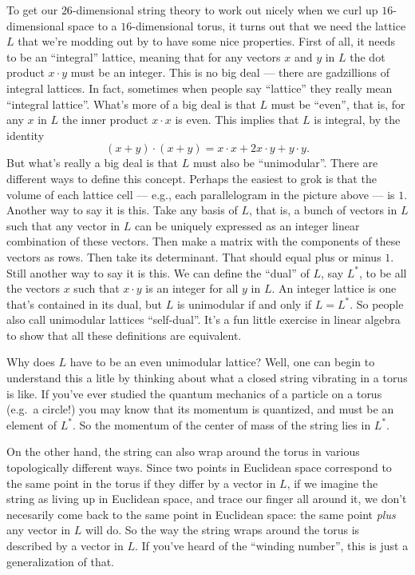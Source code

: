 \documentclass{article}
\begin{document}
To get our \(26\)-dimensional string theory to work out nicely when we
curl up \(16\)-dimensional space to a \(16\)-dimensional torus, it turns
out that we need the lattice \(L\) that we're modding out by to have
some nice properties. First of all, it needs to be an ``integral''
lattice, meaning that for any vectors \(x\) and \(y\) in \(L\) the dot
product \(x\cdot y\) must be an integer. This is no big deal --- there
are gadzillions of integral lattices. In fact, sometimes when people say
``lattice'' they really mean ``integral lattice''. What's more of a big
deal is that \(L\) must be ``even'', that is, for any \(x\) in \(L\) the
inner product \(x\cdot x\) is even. This implies that \(L\) is integral,
by the identity
\[(x + y)\cdot (x + y) = x\cdot x + 2x\cdot y + y\cdot y.\] But what's
really a big deal is that \(L\) must also be ``unimodular''. There are
different ways to define this concept. Perhaps the easiest to grok is
that the volume of each lattice cell --- e.g., each parallelogram in the
picture above --- is \(1\). Another way to say it is this. Take any
basis of \(L\), that is, a bunch of vectors in \(L\) such that any
vector in \(L\) can be uniquely expressed as an integer linear
combination of these vectors. Then make a matrix with the components of
these vectors as rows. Then take its determinant. That should equal plus
or minus \(1\). Still another way to say it is this. We can define the
``dual'' of \(L\), say \(L^*\), to be all the vectors \(x\) such that
\(x\cdot y\) is an integer for all \(y\) in \(L\). An integer lattice is
one that's contained in its dual, but \(L\) is unimodular if and only if
\(L = L^*\). So people also call unimodular lattices ``self-dual''. It's
a fun little exercise in linear algebra to show that all these
definitions are equivalent.

Why does \(L\) have to be an even unimodular lattice? Well, one can
begin to understand this a litle by thinking about what a closed string
vibrating in a torus is like. If you've ever studied the quantum
mechanics of a particle on a torus (e.g.~a circle!) you may know that
its momentum is quantized, and must be an element of \(L^*\). So the
momentum of the center of mass of the string lies in \(L^*\).

On the other hand, the string can also wrap around the torus in various
topologically different ways. Since two points in Euclidean space
correspond to the same point in the torus if they differ by a vector in
\(L\), if we imagine the string as living up in Euclidean space, and
trace our finger all around it, we don't necesarily come back to the
same point in Euclidean space: the same point \emph{plus} any vector in
\(L\) will do. So the way the string wraps around the torus is described
by a vector in \(L\). If you've heard of the ``winding number'', this is
just a generalization of that.
\end{document}
